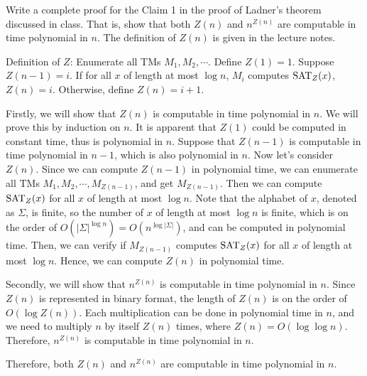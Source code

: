 \documentclass{homework}
\begin{document}
\begin{problem}
  Write a complete proof for the Claim 1 in the proof of Ladner's theorem
  discussed in class.
  That is, show that both $Z(n)$ and $n^{Z(n)}$ are computable in time
  polynomial in $n$.
  The definition of $Z(n)$ is given in the lecture notes.
\end{problem}

\begin{solution}

  Definition of $Z$: Enumerate all TMs $M_1, M_2, \cdots$. Define $Z(1) = 1$.
  Suppose $Z(n-1) = i$. If for all $x$ of length at most $\log n$,
  $M_i$ computes $\mathrm{SAT}_Z(x)$, $Z(n) = i$. Otherwise, define $Z(n) = i+1$.

  Firstly, we will show that $Z(n)$ is computable in time polynomial in $n$.
  We will prove this by induction on $n$.
  It is apparent that $Z(1)$ could be computed in constant time,
  thus is polynomial in $n$.
  Suppose that $Z(n-1)$ is computable in time polynomial in $n-1$,
  which is also polynomial in $n$.
  Now let's consider $Z(n)$.
  Since we can compute $Z(n - 1)$ in polynomial time,
  we can enumerate all TMs $M_1, M_2, \cdots, M_{Z(n-1)}$, and get $M_{Z(n-1)}$.
  Then we can compute $\mathrm{SAT}_Z(x)$ for all $x$ of length at most $\log n$.
  Note that the alphabet of $x$, denoted as $\Sigma$, is finite,
  so the number of $x$ of length at most $\log n$ is finite,
  which is on the order of $O(|\Sigma|^{\log n}) = O(n^{\log|\Sigma|})$,
  and can be computed in polynomial time.
  Then, we can verify if $M_{Z(n-1)}$ computes $\mathrm{SAT}_Z(x)$ for all $x$ of length at most $\log n$.
  Hence, we can compute $Z(n)$ in polynomial time.

  Secondly, we will show that $n^{Z(n)}$ is computable in time polynomial in $n$.
  Since $Z(n)$ is represented in binary format,
  the length of $Z(n)$ is on the order of $O(\log Z(n))$.
  Each multiplication can be done in polynomial time in $n$,
  and we need to multiply $n$ by itself $Z(n)$ times,
  where $Z(n) = O(\log\log n)$.
  Therefore, $n^{Z(n)}$ is computable in time polynomial in $n$.

  Therefore, both $Z(n)$ and $n^{Z(n)}$ are computable in time polynomial in $n$.

\end{solution}
\end{document}
